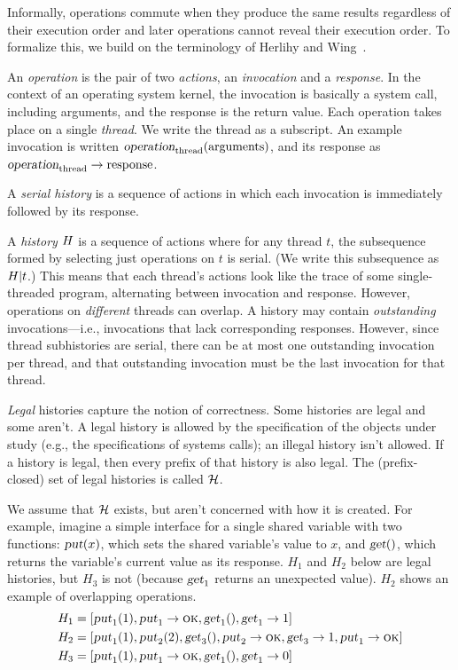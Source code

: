 Informally, operations commute when 
they produce the same results regardless of their execution order
and later operations cannot reveal their execution order.  To
formalize this, we build on the terminology of Herlihy and
Wing~\cite{herlihy:linearizability}.


An \emph{operation} is the pair of two \emph{actions}, an
\emph{invocation} and a \emph{response}. In the context of an
operating system kernel, the invocation is basically a system call,
including arguments, and the response is the return value. Each
operation takes place on a single \emph{thread}. We write the thread
as a subscript. An example invocation is written
$\INV{operation}{\text{arguments}}{\text{thread}}$, and its response
as $\RES{operation}{\text{response}}{\text{thread}}$.

A \emph{serial history} is a sequence of actions in which each
invocation is immediately followed by its response.

A \emph{history} $\HIST{H}$ is a sequence of actions where for any
thread $t$, the subsequence formed by selecting just operations on $t$
is serial. (We write this subsequence as $\HRESTRICT{\HIST{H}}{t}$.)
%
This means that each thread's actions look like the trace of
some single-threaded program, alternating between invocation and
response. However, operations on \emph{different} threads can overlap.
%
A history may contain \emph{outstanding} invocations---i.e., invocations
that lack corresponding responses. However, since thread subhistories
are serial, there can be at most one outstanding invocation per thread,
and that outstanding invocation must be the last invocation for that
thread.

\emph{Legal} histories capture the notion of correctness. Some
histories are legal and some aren't. A legal history is allowed by the
specification of the objects under study (e.g., the specifications
of systems calls); an illegal history isn't
allowed. If a history is legal, then every prefix of that history is
also legal. The (prefix-closed) set of legal histories is called
$\LEGALHIST$.

We assume that $\LEGALHIST$ exists, but aren't
concerned with how it is created. For example, imagine a
simple interface for a single shared variable with two
functions: $\OP{put}(x)$, which sets the shared variable's value to $x$,
and $\OP{get}()$, which returns the
variable's current value as its response.  $H_1$ and $H_2$ below are
legal histories, but $H_3$ is not (because $\OP{get}_1$ returns an
unexpected value). $H_2$ shows an example of overlapping
operations.
%
\begin{align*}
  H_1 = [&\INV{put}{1}{1}, \RES{put}{\OK}{1}, \INV{get}{}{1},
  \RES{get}{1}{1}] \\
  H_2 = [&\INV{put}{1}{1}, \INV{put}{2}{2}, \INV{get}{}{3},
  \RES{put}{\OK}{2}, \RES{get}{1}{3}, \RES{put}{\OK}{1}] \\
  H_3 = [&\INV{put}{1}{1}, \RES{put}{\OK}{1}, \INV{get}{}{1},
  \RES{get}{0}{1}]
\end{align*}

